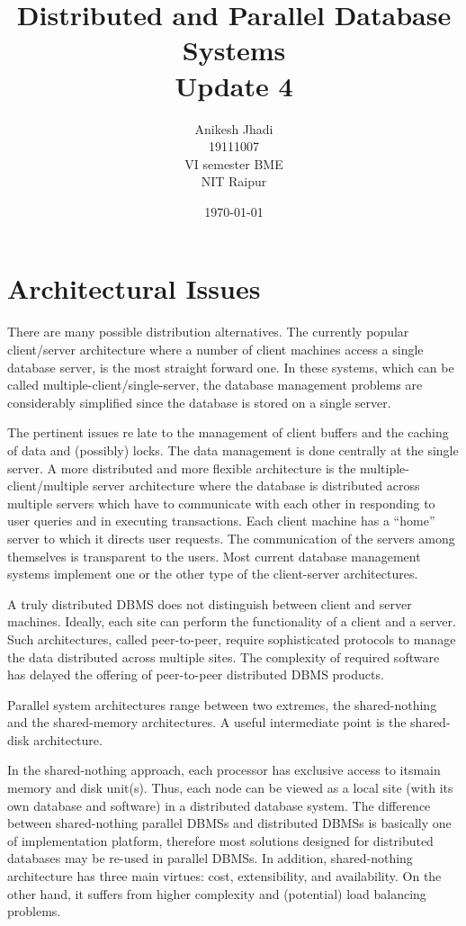 \documentclass{article}
\title{Distributed and Parallel Database Systems\\Update 4}
\author{Anikesh Jhadi \\19111007 \\VI semester BME \\NIT Raipur}
\date{\today}
\begin{document}
\maketitle

\section{Architectural Issues}
There are many possible distribution alternatives. The currently popular client/server architecture where a number of client machines access a single database server, is the most straightforward one. In these systems, which can be called multiple-client/single-server, the database management
problems are considerably simplified since the database is stored on a single server. 

The pertinent issues relate to the management of client buffers and the caching of data and (possibly) locks. The data management is done centrally at the single server.
A more distributed and more flexible architecture is the multiple-client/multiple server architecture
where the database is distributed across multiple servers which have to communicate with each other in
responding to user queries and in executing transactions. Each client machine has a “home” server to
which it directs user requests. The communication of the servers among themselves is transparent to the
users. Most current database management systems implement one or the other type of the client-server
architectures.


A truly distributed DBMS does not distinguish between client and server machines. Ideally, each site
can perform the functionality of a client and a server. Such architectures, called peer-to-peer, require
sophisticated protocols to manage the data distributed across multiple sites. The complexity of required
software has delayed the offering of peer-to-peer distributed DBMS products.


Parallel system architectures range between two extremes, the shared-nothing and the shared-memory
architectures. A useful intermediate point is the shared-disk architecture.


In the shared-nothing approach, each processor has exclusive access to itsmain memory and disk unit(s).
Thus, each node can be viewed as a local site (with its own database and software) in a distributed database
system. The difference between shared-nothing parallel DBMSs and distributed DBMSs is basically one
of implementation platform, therefore most solutions designed for distributed databases may be re-used in
parallel DBMSs. In addition, shared-nothing architecture has three main virtues: cost, extensibility, and
availability. On the other hand, it suffers from higher complexity and (potential) load balancing problems.
\end{document}
